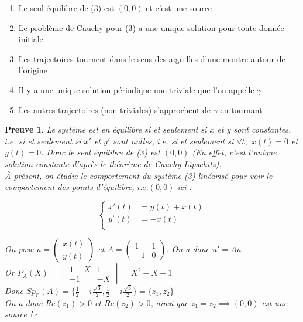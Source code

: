 \documentclass{article}
\newtheorem{preuve}{Preuve}
\begin{document}
\begin{enumerate}
    \item Le seul équilibre de (3) est $(0, 0)$ et c’est une source
    \item Le problème de Cauchy pour (3) a une unique solution pour toute donnée initiale
    \item Les trajectoires tournent dans le sens des aiguilles d’une montre autour de l’origine
    \item Il y a une unique solution périodique non triviale que l’on appelle $\gamma$ 
    \item Les autres trajectoires (non triviales) s’approchent de $\gamma$ en tournant
\end{enumerate}

\medskip

\begin{preuve}

\medskip

Le système est en équilibre si et seulement si $x$ et $y$ sont constantes, $i.e.$ 
si et seulement si $x'$ et $y'$ sont nulles, $i.e.$ 
si et seulement si $ \forall t,$ $x(t)=0$ et $y(t)=0$. Donc le seul équilibre de (3) est $(0,0)$ (En effet, c'est l'unique solution constante d'après le théorème de Cauchy-Lipschitz).
\\À présent, on étudie le comportement du système (3) linéarisé pour voir le comportement des points d'équilibre, $i.e. (0,0)$ ici :

\begin{equation*}
    \left\{
    \begin{aligned}
        x'(t) &= y(t) + x(t) \\   
        y'(t) &= -x(t)\\
   \end{aligned}
   \right.
\end{equation*}

On pose $u =\begin{pmatrix}x(t)\\y(t)\end{pmatrix}$ et $A=\begin{pmatrix}1 & 1\\-1 & 0\end{pmatrix}$. On a donc $u' = Au$
\smallskip
\\Or $P_A(X)=\begin{vmatrix}1-X & 1\\-1 & -X\end{vmatrix} = X^2-X+1$
\smallskip
\\Donc $Sp_\mathbb{C}(A) = \{ \frac{1}{2} - i \frac{\sqrt{3}}{2}, \frac{1}{2} + i \frac{\sqrt{3}}{2} \} = \{z_1,z_2\}$
\smallskip
\\On a donc $Re(z_1)>0$ et $Re(z_2)>0$, ainsi que $z_1 = \bar{z_2} \implies (0,0)$ est une source ! $\square$   

\end{preuve}
\end{document}
